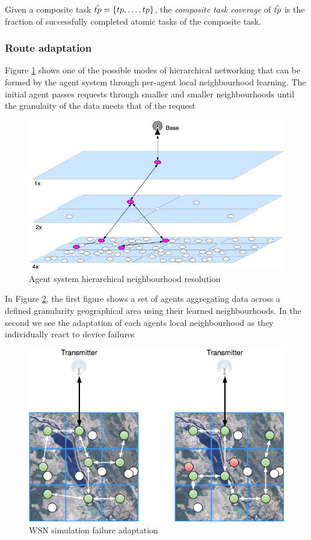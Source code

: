 \begin{definition}
	Given a composite task $\varCompositeTask{}{} = \lbrace \varAtomicTask{1}{}, \dots, \varAtomicTask{2}{} \rbrace$, the \textit{composite task coverage} of $\varCompositeTask{}{}$ is the fraction of successfully completed atomic tasks of the composite task.
\end{definition}


\subsubsection{Route adaptation}
Figure \ref{fig:wsnhierarchicalresolution} shows one of the possible modes of hierarchical networking that can be formed by the agent system through per-agent local neighbourhood learning. The initial agent passes requests through smaller and smaller neighbourhoods until the granulaity of the data meets that of the request

\begin{figure}[ht]
	\centering
	\includegraphics[width=0.5\linewidth]{WSN_hierarchical_resolution}
	\caption{Agent system hierarchical neighbourhood resolution}
	\label{fig:wsnhierarchicalresolution}
\end{figure}
In Figure \ref{fig:wsnsimulationmapfailureadaptation}, the first figure shows a set of agents aggregating data across a defined granularity geographical area using their learned neighbourhoods. In the second we see the adaptation of each agents local neighbourhood as they individually react to device failures
\begin{figure}[ht]
	\centering
	\includegraphics[width=0.5\linewidth]{WSN_simulation_map_failure_adaptation}
	\caption{WSN simulation failure adaptation}
	\label{fig:wsnsimulationmapfailureadaptation}
\end{figure}

